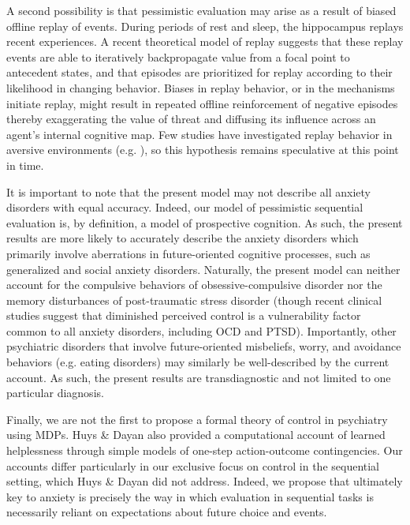 \documentclass[11pt]{article} %
\begin{document}

A second possibility is that pessimistic evaluation may arise as a result of biased offline replay of events. During periods of rest and sleep, the hippocampus replays recent experiences\citep{whats a good ref?}. A recent theoretical model of replay suggests that these replay events are able to iteratively backpropagate value from a focal point to antecedent states, and that episodes are prioritized for replay according to their likelihood in changing behavior. Biases in replay behavior, or in the mechanisms initiate replay, might result in repeated offline reinforcement of negative episodes thereby exaggerating the value of threat and diffusing its influence across an agent's internal cognitive map. Few studies have investigated replay behavior in aversive environments (e.g. \citep{wu2017}), so this hypothesis remains speculative at this point in time.   


It is important to note that the present model may not describe all anxiety disorders with equal accuracy. Indeed, our model of pessimistic sequential evaluation is, by definition, a model of prospective cognition. As such, the present results are more likely to accurately describe the anxiety disorders which primarily involve aberrations in future-oriented cognitive processes, such as generalized and social anxiety disorders. Naturally, the present model can neither account for the compulsive behaviors of obsessive-compulsive disorder nor the memory disturbances of post-traumatic stress disorder (though recent clinical studies suggest that diminished perceived control is a vulnerability factor common to all anxiety disorders, including OCD and PTSD\citep{gallagher2014a, gallagher2014b}). Importantly, other psychiatric disorders that involve future-oriented misbeliefs, worry, and avoidance behaviors (e.g. eating disorders\citep{konstantellou2011}) may similarly be well-described by the current account. As such, the present results are transdiagnostic and not limited to one particular diagnosis. 

Finally, we are not the first to propose a formal theory of control in psychiatry using MDPs. Huys \& Dayan \cite{HuysDayan2009} also provided a computational account of learned helplessness through simple models of one-step action-outcome contingencies. Our accounts differ particularly in our exclusive focus on control in the sequential setting, which Huys \& Dayan did not address. Indeed, we propose that ultimately key to anxiety is precisely the way in which evaluation in sequential tasks is necessarily reliant on expectations about future choice and events.


\small{}
\end{document}
